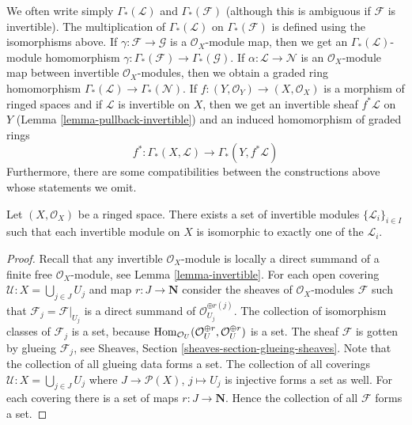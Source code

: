 \noindent
We often write simply $\Gamma_*(\mathcal{L})$ and $\Gamma_*(\mathcal{F})$
(although this is ambiguous if $\mathcal{F}$ is invertible).
The multiplication of $\Gamma_*(\mathcal{L})$ on
$\Gamma_*(\mathcal{F})$ is defined using the isomorphisms
above. If $\gamma : \mathcal{F} \to \mathcal{G}$ is a $\mathcal{O}_X$-module
map, then we get an $\Gamma_*(\mathcal{L})$-module homomorphism
$\gamma : \Gamma_*(\mathcal{F}) \to \Gamma_*(\mathcal{G})$.
If $\alpha : \mathcal{L} \to \mathcal{N}$ is an $\mathcal{O}_X$-module
map between invertible $\mathcal{O}_X$-modules, then we obtain
a graded ring homomorphism $\Gamma_*(\mathcal{L}) \to \Gamma_*(\mathcal{N})$.
If $f : (Y, \mathcal{O}_Y) \to (X, \mathcal{O}_X)$
is a morphism of ringed spaces and if $\mathcal{L}$ is invertible
on $X$, then we get an invertible sheaf $f^*\mathcal{L}$ on $Y$
(Lemma \ref{lemma-pullback-invertible})
and an induced homomorphism of graded rings
$$
f^* :
\Gamma_*(X, \mathcal{L})
\longrightarrow
\Gamma_*(Y, f^*\mathcal{L})
$$
Furthermore, there are some compatibilities between the constructions
above whose statements we omit.

\begin{lemma}
\label{lemma-pic-set}
Let $(X, \mathcal{O}_X)$ be a ringed space.
There exists a set of invertible modules $\{\mathcal{L}_i\}_{i \in I}$
such that each invertible module on $X$ is isomorphic to exactly
one of the $\mathcal{L}_i$.
\end{lemma}

\begin{proof}
Recall that any invertible $\mathcal{O}_X$-module is locally
a direct summand of a finite free $\mathcal{O}_X$-module, see
Lemma \ref{lemma-invertible}.
For each open covering $\mathcal{U} : X = \bigcup_{j \in J} U_j$
and map $r : J \to \mathbf{N}$ consider the sheaves of
$\mathcal{O}_X$-modules $\mathcal{F}$ such that
$\mathcal{F}_j = \mathcal{F}|_{U_j}$ is a direct summand of
$\mathcal{O}_{U_j}^{\oplus r(j)}$.
The collection of isomorphism classes of $\mathcal{F}_j$ is a set, because
$\mathop{\mathrm{Hom}}\nolimits_{\mathcal{O}_U}(\mathcal{O}_U^{\oplus r}, \mathcal{O}_U^{\oplus r})$
is a set. The sheaf $\mathcal{F}$ is gotten by glueing $\mathcal{F}_j$,
see Sheaves, Section
\ref{sheaves-section-glueing-sheaves}. Note that the collection of
all glueing data forms a set. The collection of all coverings
$\mathcal{U} : X = \bigcup_{j \in J} U_j$ where $J \to \mathcal{P}(X)$,
$j \mapsto U_j$ is injective forms a set as well. For each covering
there is a set of maps $r : J \to \mathbf{N}$. Hence the collection
of all $\mathcal{F}$ forms a set.
\end{proof}

